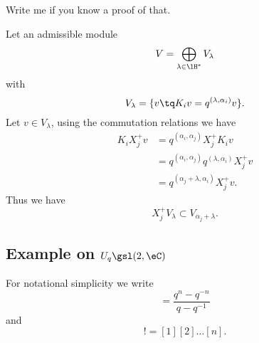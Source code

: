 \begin{probleme}
	Write me if you know a proof of that.
\end{probleme}

Let an admissible module
\begin{equation}
	V=\bigoplus_{\lambda\in\lH^*}V_{\lambda}
\end{equation}
with
\begin{equation}
	V_{\lambda}=\{ v\tq K_iv=q^{(\lambda,\alpha_i)}v \}.
\end{equation}
Let \( v\in V_{\lambda}\), using the commutation relations we have
\begin{subequations}
	\begin{align}
		K_i X_j^+v & =q^{(\alpha_i,\alpha_j)}X_j^+K_iv                    \\
		           & =q^{(\alpha_i,\alpha_j)}q^{(\lambda,\alpha_i)}X_j^+v \\
		           & =q^{(\alpha_j+\lambda,\alpha_i)}X_j^+v.
	\end{align}
\end{subequations}
Thus we have
\begin{equation}
	X_j^+ V_{\lambda}\subset V_{\alpha_j+\lambda}.
\end{equation}

\subsection{Example on $U_q\gsl(2,\eC)$}

For notational simplicity we write
\begin{equation}
	[n]=\frac{ q^{n}-q^{-n} }{ q-q^{-1} }
\end{equation}
and
\begin{equation}
	[n]!=[1][2]\ldots [n].
\end{equation}

